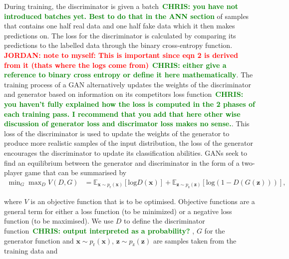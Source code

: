 \documentclass[12pt]{iopart}
\newcommand{\jordan}[1]{\textbf{\textcolor{red}{JORDAN: #1}}}
\newcommand{\chris}[1]{\textbf{\textcolor{green}{CHRIS: #1}}}
\begin{document}
%
During training, the discriminator is given a batch~\chris{you have not
introduced batches yet. Best to do that in the ANN section} of samples that
contains one half real data and one half fake data which it then makes
predictions on.  The loss for the discriminator is calculated by comparing its
predictions to the labelled data through the binary cross-entropy function.
\jordan{note to myself: This is important since eqn 2 is derived from it (thats
where the logs come from)}~\chris{either give a reference to binary cross
entropy or define it here mathematically}. The training process of a \ac{GAN}
alternatively updates the weights of the discriminator and generator based on
information on its competitors loss function~\chris{you haven't fully explained
how the loss is computed in the 2 phases of each training pass. I recommend
that you add that here other wise discussion of generator loss and discrimator
loss makes no sense.}. This loss of the discriminator is used to update the
weights of the generator to produce more realistic samples of the input
distribution, the loss of the generator encourages the discriminator to update
its classification abilities. \acp{GAN} seek to find an equilibrium between the
generator and discriminator in the form of a two-player game that can be
summarised by 
%
\begin{align}
  \mathop{\text{min}}_{G}  \mathop{\text{max}}_{D} V(D,G) &= \mathbb{E}_{\mathbf{x} \sim p_{\text{r}}(\mathbf{x})} [\text{log} D(\mathbf{x})] + \mathbb{E}_{\mathbf{z} \sim p_{\text{z}}(\mathbf{z})} [\text{log}(1-D(G(\mathbf{z})))],
\label{equation:GANloss}
\end{align}
%
%

%
where $V$ is an objective function that is to be optimised. Objective functions
are a general term for either a loss function (to be minimized) or a negative
loss function (to be maximised). We use $D$ to define the discriminator
function~\chris{output interpreted as a probability?} , $G$ for the generator
function and ${\mathbf{x} \sim p_{\text{r}}(\mathbf{x})}$, ${\mathbf{z} \sim
p_{\text{z}}(\mathbf{z})}$ are samples taken from the training data and
\end{document}
